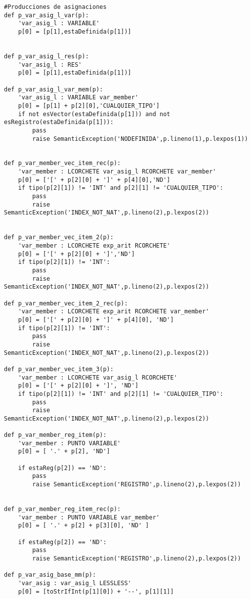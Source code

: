 \begin{verbatim}
#Producciones de asignaciones
def p_var_asig_l_var(p):
    'var_asig_l : VARIABLE'
    p[0] = [p[1],estaDefinida(p[1])]


def p_var_asig_l_res(p):
    'var_asig_l : RES'
    p[0] = [p[1],estaDefinida(p[1])]

def p_var_asig_l_var_mem(p):
    'var_asig_l : VARIABLE var_member'
    p[0] = [p[1] + p[2][0],'CUALQUIER_TIPO']
    if not esVector(estaDefinida(p[1])) and not esRegistro(estaDefinida(p[1])):
        pass
        raise SemanticException('NODEFINIDA',p.lineno(1),p.lexpos(1))
    	

def p_var_member_vec_item_rec(p):
    'var_member : LCORCHETE var_asig_l RCORCHETE var_member'
    p[0] = ['[' + p[2][0] + ']' + p[4][0],'ND']
    if tipo(p[2][1]) != 'INT' and p[2][1] != 'CUALQUIER_TIPO':
        pass
        raise SemanticException('INDEX_NOT_NAT',p.lineno(2),p.lexpos(2))

    
def p_var_member_vec_item_2(p):
    'var_member : LCORCHETE exp_arit RCORCHETE'
    p[0] = ['[' + p[2][0] + ']','ND']
    if tipo(p[2][1]) != 'INT':
        pass
        raise SemanticException('INDEX_NOT_NAT',p.lineno(2),p.lexpos(2))
    
def p_var_member_vec_item_2_rec(p):
    'var_member : LCORCHETE exp_arit RCORCHETE var_member'
    p[0] = ['[' + p[2][0] + ']' + p[4][0], 'ND']
    if tipo(p[2][1]) != 'INT':
        pass
        raise SemanticException('INDEX_NOT_NAT',p.lineno(2),p.lexpos(2))
    
def p_var_member_vec_item_3(p):
    'var_member : LCORCHETE var_asig_l RCORCHETE'
    p[0] = ['[' + p[2][0] + ']', 'ND']
    if tipo(p[2][1]) != 'INT' and p[2][1] != 'CUALQUIER_TIPO':
        pass
        raise SemanticException('INDEX_NOT_NAT',p.lineno(2),p.lexpos(2))

def p_var_member_reg_item(p):
    'var_member : PUNTO VARIABLE'
    p[0] = [ '.' + p[2], 'ND']

    if estaReg(p[2]) == 'ND':
        pass
        raise SemanticException('REGISTRO',p.lineno(2),p.lexpos(2))

    
def p_var_member_reg_item_rec(p):
    'var_member : PUNTO VARIABLE var_member'
    p[0] = [ '.' + p[2] + p[3][0], 'ND' ]
    
    if estaReg(p[2]) == 'ND':
        pass
        raise SemanticException('REGISTRO',p.lineno(2),p.lexpos(2))

def p_var_asig_base_mm(p):
    'var_asig : var_asig_l LESSLESS'
    p[0] = [toStrIfInt(p[1][0]) + '--', p[1][1]]


\end{verbatim}
